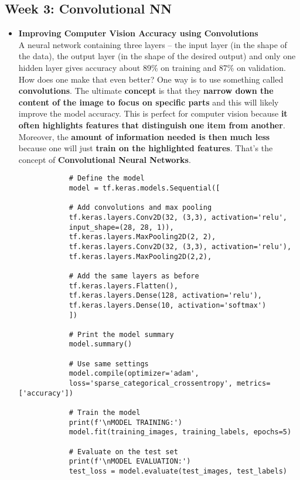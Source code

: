 \documentclass[20pt]{article}
\begin{document}
	\subsection{Week 3: Convolutional NN}
	\begin{itemize}
		\item \textbf{Improving Computer Vision Accuracy using Convolutions}\\
		A neural network containing three layers -- the input layer (in the shape of the data), the output layer (in the shape of the desired output) and only one hidden layer gives accuracy about 89\% on training and 87\% on validation. How does one make that even better? One way is to use something called \textbf{convolutions}. The ultimate \textbf{concept} is that they \textbf{narrow down the content of the image to focus on specific parts} and this will likely improve the model accuracy. This is perfect for computer vision because \textbf{it often highlights features that distinguish one item from another}. Moreover, the \textbf{amount of information needed is then much less} because one will just \textbf{train on the highlighted features}.
		That's the concept of \textbf{Convolutional Neural Networks}.
		\begin{verbatim}
			# Define the model
			model = tf.keras.models.Sequential([
			
			# Add convolutions and max pooling
			tf.keras.layers.Conv2D(32, (3,3), activation='relu',
			input_shape=(28, 28, 1)),
			tf.keras.layers.MaxPooling2D(2, 2),
			tf.keras.layers.Conv2D(32, (3,3), activation='relu'),
			tf.keras.layers.MaxPooling2D(2,2),
			
			# Add the same layers as before
			tf.keras.layers.Flatten(),
			tf.keras.layers.Dense(128, activation='relu'),
			tf.keras.layers.Dense(10, activation='softmax')
			])
			
			# Print the model summary
			model.summary()
			
			# Use same settings
			model.compile(optimizer='adam',
			loss='sparse_categorical_crossentropy', metrics=['accuracy'])
			
			# Train the model
			print(f'\nMODEL TRAINING:')
			model.fit(training_images, training_labels, epochs=5)
			
			# Evaluate on the test set
			print(f'\nMODEL EVALUATION:')
			test_loss = model.evaluate(test_images, test_labels)
		\end{verbatim} 
		
		
	\end{itemize}
	
	
\end{document}
